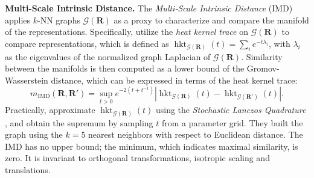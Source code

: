 \documentclass{article}
\newcommand{\citet}{\textcite}
\newcommand{\R}{\bm{R}}
\newcommand{\Rp}{\bm{R'}}
\newcommand{\subheader}{\textbf}
\begin{document}
\subheader{Multi-Scale Intrinsic Distance.}
The \emph{Multi-Scale Intrinsic Distance} (IMD) \cite{tsitsulin_shape_2020} applies $k$-NN graphs $\mathcal{G}(\R)$ as a proxy to characterize and compare the manifold of the representations.
Specifically, \citet{tsitsulin_shape_2020} utilize the \emph{heat kernel trace} on $\mathcal{G}(\R)$ to compare representations, which is defined as $\operatorname{hkt}_{\mathcal{G}(\R)}(t)=\sum_i e^{-t\lambda_i}$, with $\lambda_i$ as the eigenvalues of the normalized graph Laplacian of $\mathcal{G}(\R)$.
Similarity between the manifolds is then computed as a lower bound of the Gromov-Wasserstein distance, which can be expressed in terms of the heat kernel trace:
\begin{equation}\label{eq:imd}
    m_{\text{IMD}}(\R, \Rp) = \sup_{t>0} e^{-2(t+t^{-1})} | \operatorname{hkt}_{\mathcal{G}(\R)}(t) - \operatorname{hkt}_{\mathcal{G}(\Rp)}(t)|.
\end{equation}
Practically, \citet{tsitsulin_shape_2020} approximate $\operatorname{hkt}_{\mathcal{G}(\R)}(t)$ using the \emph{Stochastic Lanczos Quadrature} \cite{ubaru_fast_2017}, and obtain the supremum by sampling $t$ from a parameter grid.
They built the graph using the $k=5$ nearest neighbors with respect to Euclidean distance.
The IMD has no upper bound; the minimum, which indicates maximal similarity, is zero.
It is invariant to orthogonal transformations, isotropic scaling and translations.
\end{document}
